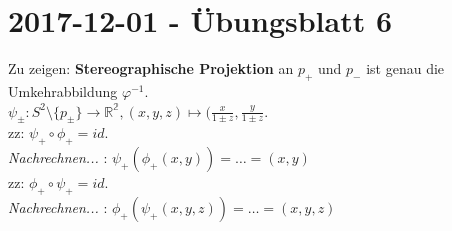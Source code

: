 \section{2017-12-01 - Übungsblatt 6} %
\label{2017-12-01}

\begin{problem*}[1a]
Zu zeigen: \textbf{Stereographische Projektion} an $ p_+ $ und $ p_- $ ist genau die Umkehrabbildung $ \varphi^{ -1 }$. \\
$\psi_\pm : S^2 \setminus  \{ p_\pm \} \to \mathbb{R^2}, (x,y,z) \mapsto (\frac{x}{1\pm z},\frac{y}{1\pm z}$.\\
zz: $ \psi_+ \circ \phi_+ = id $.\\ \emph{Nachrechnen...} : $\psi_+ ( \phi_+ (x,y)) = \dots = (x,y)$\\
zz: $\phi_+ \circ  \psi_+ = id$. \\ \emph{Nachrechnen...} : $\phi_+ ( \psi_+ (x,y,z)) = \dots = (x,y,z)$\\
\end{problem*}

